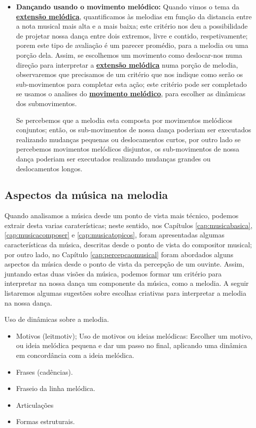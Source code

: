 \begin{itemize}
\item \textbf{Dançando usando o movimento melódico:}
Quando vimos o tema da \hyperref[ref:melodica:range]{\textbf{extensão melódica}},
quantificamos às melodias em função da distancia entre a nota musical mais alta e a mais baixa;
este critério nos deu a possibilidade de projetar nossa dança entre dois extremos,
livre e contido, respetivamente;
porem este tipo de avaliação é um parecer promédio,
para a melodia ou uma porção dela. 
Assim, se escolhemos um movimento como deslocar-nos numa direção 
para interpretar a \hyperref[ref:melodica:range]{\textbf{extensão melódica}} numa porção de melodia,
observaremos que precisamos de um critério que nos indique como serão os sub-movimentos para completar esta ação;
este critério pode ser completado se usamos o analises do \hyperref[ref:melodica:movimento]{\textbf{movimento melódico}},
para escolher as dinâmicas dos submovimentos.
\begin{example}
Se percebemos que a melodia esta composta por movimentos melódicos conjuntos;
então, 
os sub-movimentos de nossa dança poderiam ser executados realizando mudanças pequenas ou deslocamentos curtos,
por outro lado se percebemos movimentos melódicos disjuntos,
os sub-movimentos de nossa dança poderiam ser executados realizando mudanças grandes ou deslocamentos longos.
\end{example}
\end{itemize}


\subsection{Aspectos da música na melodia} 
Quando analisamos a música desde um ponto de vista mais técnico, 
podemos extrair desta varias caraterísticas; 
neste sentido, nos Capítulos \ref{cap:musicabasica},
\ref{cap:musicacomposer} e \ref{cap:musicatopicos},
foram apresentadas algumas características da música, 
descritas desde o ponto de vista do compositor musical;
por outro lado, no Capítulo \ref{cap:percepcaomusical} 
foram abordados alguns aspectos da música desde o ponto de vista da percepção de um ouvinte.
Assim, juntando estas duas visões da música,
podemos formar um critério para interpretar  na nossa dança um componente da música, como a melodia.
A seguir listaremos algumas sugestões sobre escolhas criativas para interpretar a melodia na nossa dança.

Uso de dinâmicas sobre a melodia. 
\begin{itemize}
\item Motivos (leitmotiv); Uso de motivos ou ideias melódicas: Escolher um motivo, ou ideia melódica pequena e dar um passo no final, 
aplicando uma dinâmica em concordância com a ideia melódica.
\item Frases (cadências).
\item Fraseio da linha melódica.
\item Articulações
\item Formas estruturais.
\end{itemize}



